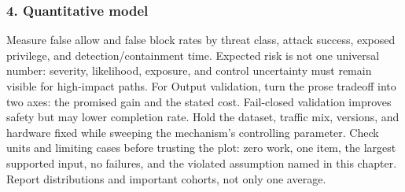 \subsubsection*{4. Quantitative model}
Measure false allow and false block rates by threat class, attack success, exposed privilege, and detection/containment time. Expected risk is not one universal number: severity, likelihood, exposure, and control uncertainty must remain visible for high-impact paths.
For Output validation, turn the prose tradeoff into two axes: the promised gain and the stated cost. Fail-closed validation improves safety but may lower completion rate. Hold the dataset, traffic mix, versions, and hardware fixed while sweeping the mechanism's controlling parameter.
Check units and limiting cases before trusting the plot: zero work, one item, the largest supported input, no failures, and the violated assumption named in this chapter. Report distributions and important cohorts, not only one average.

